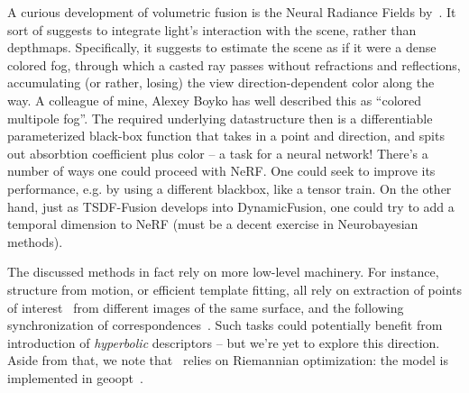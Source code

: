 A curious development of volumetric fusion is the Neural Radiance Fields
by~\citet{nerf}. It sort of suggests to integrate light's interaction with the
scene, rather than depthmaps.  Specifically, it suggests to estimate the scene
as if it were a dense colored fog, through which a casted ray passes without
refractions and reflections, accumulating (or rather, losing) the view
direction-dependent color along the way. A colleague of mine, Alexey Boyko has
well described this as ``colored multipole fog''. The required underlying
datastructure then is a differentiable parameterized black-box function that
takes in a point and direction, and spits out absorbtion coefficient plus color
-- a task for a neural network!
There's a number of ways one could proceed with NeRF. One could seek to improve
its performance, e.g. by using a different blackbox, like a tensor train.  On
the other hand, just as TSDF-Fusion develops into DynamicFusion, one could try
to add a temporal dimension to NeRF (must be a decent exercise in Neurobayesian
methods).

The discussed methods in fact rely on more low-level machinery. For instance,
structure from motion, or efficient template fitting, all rely on extraction of
points of interest~\cite{r2d2} from different images of the same surface, and
the following synchronization of correspondences~\cite{birdalCorrespondences}.
Such tasks could potentially benefit from introduction of \emph{hyperbolic}
descriptors -- but we're yet to explore this direction. Aside from that, we
note that~\citet{birdalCorrespondences} relies on Riemannian optimization:
the model is implemented in geoopt~\cite{geoopt}.


